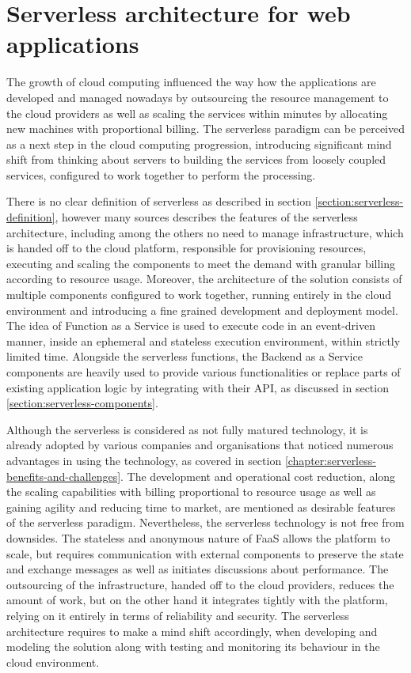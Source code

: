 \chapter{Serverless architecture for web applications}

The growth of cloud computing influenced the way how the applications are developed and managed nowadays by outsourcing the resource management to the cloud providers as well as scaling the services within minutes by allocating new machines with proportional billing. The serverless paradigm can be perceived as a next step in the cloud computing progression, introducing significant mind shift from thinking about servers to building the services from loosely coupled services, configured to work together to perform the processing.

There is no clear definition of serverless as described in section \ref{section:serverless-definition}, however many sources describes the features of the serverless architecture, including among the others no need to manage infrastructure, which is handed off to the cloud platform, responsible for provisioning resources, executing and scaling the components to meet the demand with granular billing according to resource usage. Moreover, the architecture of the solution consists of multiple components configured to work together, running entirely in the cloud environment and introducing a fine grained development and deployment model.
The idea of Function as a Service is used to execute code in an event-driven manner, inside an ephemeral and stateless execution environment, within strictly limited time. Alongside the serverless functions, the Backend as a Service components are heavily used to provide various functionalities or replace parts of existing application logic by integrating with their API, as discussed in section \ref{section:serverless-components}.

Although the serverless is considered as not fully matured technology, it is already adopted by various companies and organisations that noticed numerous advantages in using the technology, as covered in section \ref{chapter:serverless-benefits-and-challenges}.
The development and operational cost reduction, along the scaling capabilities with billing proportional to resource usage as well as gaining agility and reducing time to market, are mentioned as desirable features of the serverless paradigm.
Nevertheless, the serverless technology is not free from downsides. The stateless and anonymous nature of FaaS allows the platform to scale, but requires communication with external components to preserve the state and exchange messages as well as initiates discussions about performance. The outsourcing of the infrastructure, handed off to the cloud providers, reduces the amount of work, but on the other hand it integrates tightly with the platform, relying on it entirely in terms of reliability and security. The serverless architecture requires to make a mind shift accordingly, when developing and modeling the solution along with testing and monitoring its behaviour in the cloud environment.

